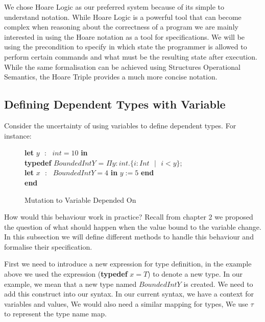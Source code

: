 \documentclass[a4paper,12pt]{report}
\newenvironment{tabs}[1]
 {\flushleft\TabPositions{#1}}
 {\endflushleft}
\begin{document}
\par
We chose Hoare Logic as our preferred system because of its simple to understand 
notation. While Hoare Logic is a powerful tool that can become complex when 
reasoning about the correctness of a program we are mainly interested in using 
the Hoare notation as a tool for specifications. We will be using the 
precondition to specify in which state the programmer is allowed to perform 
certain commands and what must be the resulting state after execution. While the 
same formalisation can be achieved using Structures Operational Semantics, the 
Hoare Triple provides a much more concise notation. 


\subsection{Defining Dependent Types with Variable}
Consider the uncertainty of using variables to define dependent types. For 
instance: 

\begin{figure} [H]
  \begin{tabs}{1cm,2cm}
    \textbf{let }$y\text{ }:\text{ } int = 10$ \textbf{ in } \\
    \tab\textbf{typedef }$BoundedIntY$ = $\Pi y : int. \{i : Int\text{ }|\text{ }i < y\}$; \\ 
    \tab\textbf{let }$x\text{ }:\text{ }BoundedIntY = 4$ \textbf{ in }$y := 5$\textbf { end} \\
    \textbf {end}
  \end{tabs}  
  \caption{Mutation to Variable Depended On}
\end{figure}

\par
How would this behaviour work in practice? Recall from chapter 2 we proposed the 
question of what should happen when the value bound to the variable change. In 
this subsection we will define different methods to handle this behaviour and 
formalise their specification.

\par
First we need to introduce a new expression for type definition, in the example 
above we used the expression (\textbf{typedef} $x = T$) to denote a new type. 
In our example, we mean 
that a new type named $BoundedIntY$ is created. We need to add this construct 
into our syntax. In our current syntax, we have a context for variables and 
values, We would also need a similar mapping for types, We use $\tau$ to 
represent the type name map. 
\end{document}
